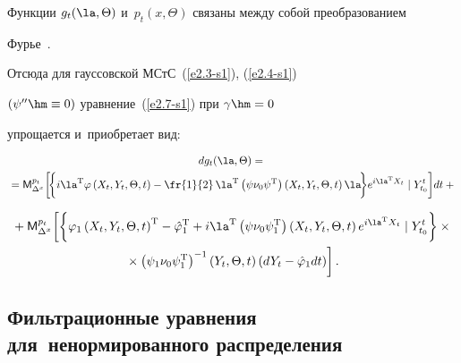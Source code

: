Функции $g_t (\la,\Theta)$ и~$p_t(x,\Theta)$ связаны между собой преобразованием 

\mbox{Фурье}~\cite{7-s1}.



Отсюда для гауссовской МСтС~(\ref{e2.3-s1}), (\ref{e2.4-s1}) 

$(\psi''\hm\equiv 0)$ уравнение~(\ref{e2.7-s1}) при  $\gamma\hm=0$ 

упрощается и~приобретает вид:

\begin{multline*}

dg_t (\la,\Theta) = {}\\

{}={\sf M}_{\Delta^x}^{p_t} \biggl[\!\biggl\{ 

i\la^{\mathrm{T}} \varphi \left(X_t,Y_t,\Theta, t\right) - \fr{1}{2}\, \la^{\mathrm{T}} 

\left(\psi\nu_0\psi^{\mathrm{T}}\right) \left(X_t,Y_t,\Theta, t\right) \la\!\biggr\}

 e^{i\la^{\mathrm{T}} X_t} \mid Y_{t_0}^t\biggr] dt+{}

 \end{multline*}

 

 \noindent

\begin{multline}

{}+ {\sf M}_{\Delta^x}^{p_t} \biggl[ \biggl\{ 

\varphi_1 \left(X_t,Y_t,\Theta, t\right)^{\mathrm{T}} -\hat\varphi_1^{\mathrm{T}} +

    i\la^{\mathrm{T}} \left(\psi\nu_0\psi_1^{\mathrm{T}}\right) \left(X_t,Y_t, \Theta,t\right) 

 e^{i\la^{\mathrm{T}} X_t} \mid Y_{t_0}^t \biggr\}\times{}\\

 {}\times 

\left(\psi_1\nu_0\psi_1^{\mathrm{T}}\right)^{-1} \left(Y_t,\Theta,t\right) \left(dY_t-\hat\varphi_1

    dt\right)\biggr]\,. \label{e2.11-s1}

    \end{multline}



\subsection{Фильтрационные уравнения для~ненормированного распределения}



